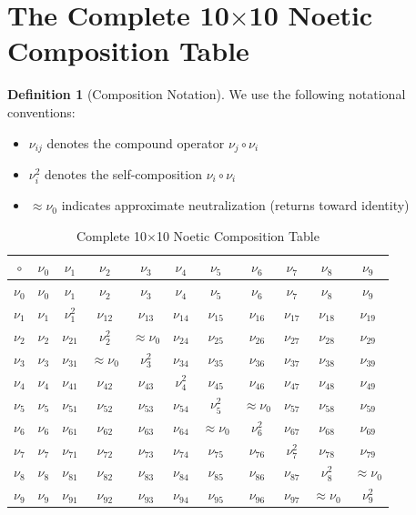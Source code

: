 \documentclass[11pt,twoside,openright]{book}
\theoremstyle{definition}
\newtheorem{definition}{Definition}[chapter]
\theoremstyle{plain}
\theoremstyle{remark}
\newcommand{\noe}[1]{\nu_{#1}}
\begin{document}
\section{The Complete 10$\times$10 Noetic Composition Table}

\begin{definition}[Composition Notation]
\label{def:comp-notation}
We use the following notational conventions:
\begin{itemize}
  \item $\noe{ij}$ denotes the compound operator $\noe{j} \circ \noe{i}$
  \item $\noe{i}^2$ denotes the self-composition $\noe{i} \circ \noe{i}$
  \item $\approx \noe{0}$ indicates approximate neutralization (returns toward identity)
\end{itemize}
\end{definition}

\begin{table}[h]
\centering
\caption{Complete 10$\times$10 Noetic Composition Table}
\label{tab:composition}
\small
\begin{tabular}{c|cccccccccc}
$\circ$ & $\noe{0}$ & $\noe{1}$ & $\noe{2}$ & $\noe{3}$ & $\noe{4}$ & $\noe{5}$ & $\noe{6}$ & $\noe{7}$ & $\noe{8}$ & $\noe{9}$ \\
\hline
$\noe{0}$ & $\noe{0}$ & $\noe{1}$ & $\noe{2}$ & $\noe{3}$ & $\noe{4}$ & $\noe{5}$ & $\noe{6}$ & $\noe{7}$ & $\noe{8}$ & $\noe{9}$ \\
$\noe{1}$ & $\noe{1}$ & $\noe{1}^2$ & $\noe{12}$ & $\noe{13}$ & $\noe{14}$ & $\noe{15}$ & $\noe{16}$ & $\noe{17}$ & $\noe{18}$ & $\noe{19}$ \\
$\noe{2}$ & $\noe{2}$ & $\noe{21}$ & $\noe{2}^2$ & $\approx\noe{0}$ & $\noe{24}$ & $\noe{25}$ & $\noe{26}$ & $\noe{27}$ & $\noe{28}$ & $\noe{29}$ \\
$\noe{3}$ & $\noe{3}$ & $\noe{31}$ & $\approx\noe{0}$ & $\noe{3}^2$ & $\noe{34}$ & $\noe{35}$ & $\noe{36}$ & $\noe{37}$ & $\noe{38}$ & $\noe{39}$ \\
$\noe{4}$ & $\noe{4}$ & $\noe{41}$ & $\noe{42}$ & $\noe{43}$ & $\noe{4}^2$ & $\noe{45}$ & $\noe{46}$ & $\noe{47}$ & $\noe{48}$ & $\noe{49}$ \\
$\noe{5}$ & $\noe{5}$ & $\noe{51}$ & $\noe{52}$ & $\noe{53}$ & $\noe{54}$ & $\noe{5}^2$ & $\approx\noe{0}$ & $\noe{57}$ & $\noe{58}$ & $\noe{59}$ \\
$\noe{6}$ & $\noe{6}$ & $\noe{61}$ & $\noe{62}$ & $\noe{63}$ & $\noe{64}$ & $\approx\noe{0}$ & $\noe{6}^2$ & $\noe{67}$ & $\noe{68}$ & $\noe{69}$ \\
$\noe{7}$ & $\noe{7}$ & $\noe{71}$ & $\noe{72}$ & $\noe{73}$ & $\noe{74}$ & $\noe{75}$ & $\noe{76}$ & $\noe{7}^2$ & $\noe{78}$ & $\noe{79}$ \\
$\noe{8}$ & $\noe{8}$ & $\noe{81}$ & $\noe{82}$ & $\noe{83}$ & $\noe{84}$ & $\noe{85}$ & $\noe{86}$ & $\noe{87}$ & $\noe{8}^2$ & $\approx\noe{0}$ \\
$\noe{9}$ & $\noe{9}$ & $\noe{91}$ & $\noe{92}$ & $\noe{93}$ & $\noe{94}$ & $\noe{95}$ & $\noe{96}$ & $\noe{97}$ & $\approx\noe{0}$ & $\noe{9}^2$ \\
\end{tabular}
\end{table}
\end{document}
